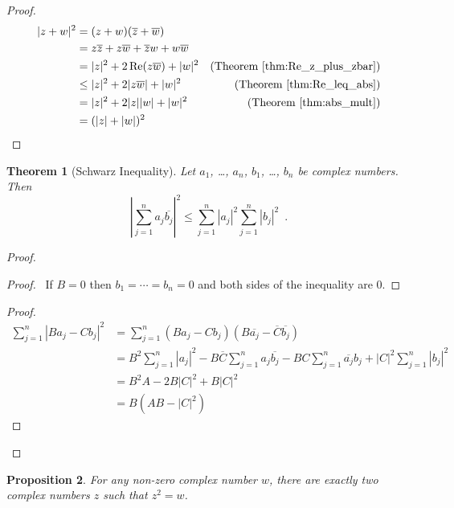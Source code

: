 \documentclass{book}
\let\qed\relax
\newtheorem{prop}{Proposition}[chapter]
\newtheorem{thm}[prop]{Theorem}
\theoremstyle{definition}
\begin{document}
\begin{proof}
\pf
\begin{align*}
|z+w|^2 & = (z+w)(\overline{z} + \overline{w}) \\
& = z \overline{z} + z \overline{w} + \overline{z} w + w \overline{w} \\
& = |z|^2 + 2 \Re(z \overline{w}) + |w|^2 & 
(\text{Theorem \ref{thm:Re_z_plus_zbar}}) \\
& \leq |z|^2 + 2 |z \overline{w}| + |w|^2 &
(\text{Theorem \ref{thm:Re_leq_abs}}) \\
& = |z|^2 + 2 |z||w| + |w|^2 &
(\text{Theorem \ref{thm:abs_mult}}) \\
& = (|z| + |w|)^2 & \qed
\end{align*}
\end{proof}

\begin{thm}[Schwarz Inequality]
Let $a_1$, \ldots, $a_n$, $b_1$, \ldots, $b_n$ be complex numbers. Then
\[ \left| \sum_{j=1}^n a_j \overline{b_j} \right|^2 \leq \sum_{j=1}^n |a_j|^2 \sum_{j=1}^n |b_j|^2 \enspace . \]
\end{thm}

\begin{proof}
\pf
{}
\begin{proof}
	\pf\ If $B = 0$ then $b_1 = \cdots = b_n = 0$ and both sides of the inequality are 0.
\end{proof}
\begin{proof}
	\pf
	\begin{align*}
		\sum_{j=1}^n |Ba_j - Cb_j|^2 & = \sum_{j=1}^n (Ba_j - Cb_j)(B \overline{a_j} - \overline{C} \overline{b_j}) \\
		& = B^2 \sum_{j=1}^n |a_j|^2 - B \overline{C} \sum_{j=1}^n a_j \overline{b_j} - BC \sum_{j=1}^n \overline{a_j} b_j + |C|^2 \sum_{j=1}^n |b_j|^2 \\
		& = B^2 A - 2 B |C|^2 + B |C|^2 \\
		& = B(AB - |C|^2)
	\end{align*}
\end{proof}
\qed
\end{proof}

\begin{prop}
For any non-zero complex number $w$, there are exactly two complex numbers $z$ such that $z^2 = w$.
\end{prop}
\end{document}
